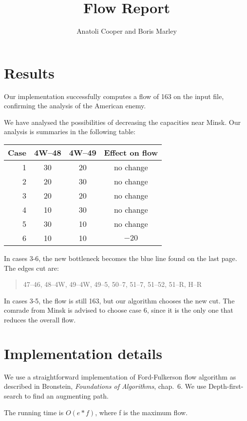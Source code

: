 \documentclass{tufte-handout}
\title{Flow Report}
\author{Anatoli Cooper and Boris Marley}
\begin{document}
  \maketitle

  \section{Results}

  Our implementation successfully computes a flow of 163 on the input file, confirming the analysis of the American enemy.

  We have analysed the possibilities of decreasing the capacities near Minsk.
  Our analysis is summaries in the following table:

\bigskip
  \begin{tabular}{rccc}\toprule
    Case & 4W--48 & 4W--49 & Effect on flow \\\midrule
    1& 30& 20 & no change \\
    2& 20& 30 & no change \\
    3& 20& 20 & no change \\
    4& 10& 30 & no change \\
    5& 30& 10 & no change \\
    6& 10& 10 & $-20$ \\\bottomrule
  \end{tabular}
  \bigskip

  In cases 3-6, the new bottleneck becomes the blue line found on the last page. The edges cut are:
  \begin{quote}
      47--46, 48--4W, 49--4W, 49--5, 50--7, 51--7, 51--52, 51--R, H--R
  \end{quote}

  In cases 3-5, the flow is still 163, but our algorithm chooses the new cut.
  The comrade from Minsk is advised to choose case 6, since it is the only one that reduces the overall flow.

  \section{Implementation details}

  We use a straightforward implementation of Ford-Fulkerson flow algorithm as described in Bronstein, \emph{Foundations of Algorithms}, chap.~6.
  We use Depth-first-search to find an augmenting path.

  The running time is $O(e*f)$, where f is the maximum flow.
\end{document}
